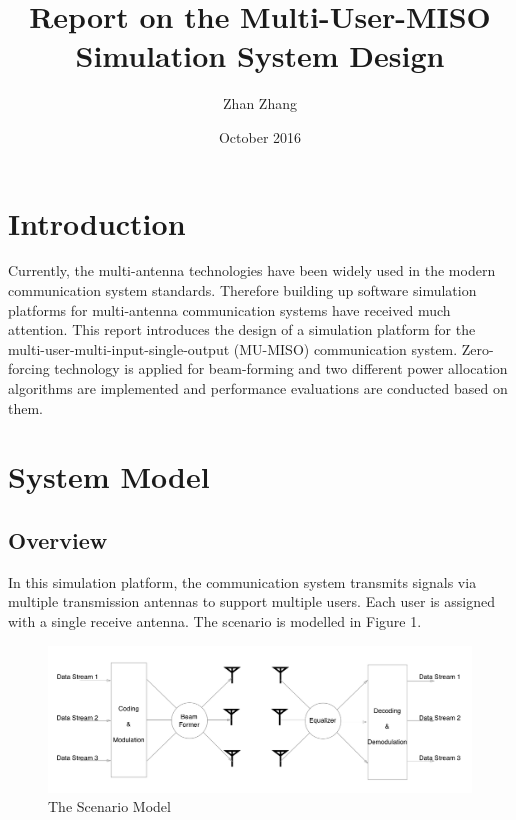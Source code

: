\documentclass{article}
\title{Report on the Multi-User-MISO Simulation System Design}
\author{Zhan Zhang}
\date{October 2016}
\begin{document}
\maketitle

\section{Introduction}
Currently, the multi-antenna technologies have been widely used in the modern communication system standards.
Therefore building up software simulation platforms for multi-antenna communication systems have received much attention.
This report introduces the design of a simulation platform for
the multi-user-multi-input-single-output (MU-MISO) communication system.
Zero-forcing technology is applied for beam-forming and two different
power allocation algorithms are implemented and performance evaluations are conducted based on them.

\section{System Model}
\subsection{Overview}
In this simulation platform, the communication system transmits signals via multiple transmission antennas to support multiple users.
Each user is assigned with a single receive antenna. The scenario is modelled in Figure 1.
\begin{figure}[ht]
\centering
\includegraphics[scale=0.18]{Scenario.png}
\caption{The Scenario Model}
\label{fig:Scenario}
\end{figure}
\end{document}

